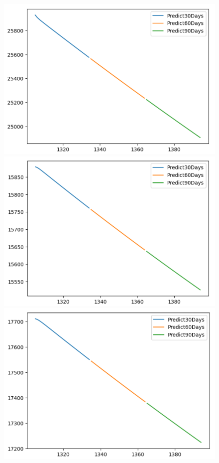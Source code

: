 \begin{figure}[H]
\begin{minipage}{0.15\textwidth}
    \includegraphics[width=1\textwidth]{resources/chapter-5/newdata1/predicted/EIB_VARMA_7-3_30days.png}
    \end{minipage}
    \hfill
    \begin{minipage}{0.15\textwidth}
    \centering
    \includegraphics[width=1\textwidth]{resources/chapter-5/newdata1/predicted/EIB_VARMA_8-2_30days.png}
    \end{minipage}
    \hfill
        \begin{minipage}{0.15\textwidth}
    \centering
    \includegraphics[width=1\textwidth]{resources/chapter-5/newdata1/predicted/EIB_VARMA_9-1_30days.png}

\end{minipage}
\end{figure}
